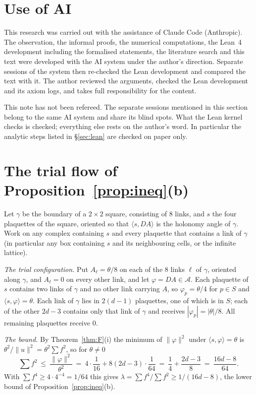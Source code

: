 \documentclass[11pt,a4paper]{article}
\theoremstyle{definition}
\theoremstyle{remark}
\newcommand{\cA}{\mathcal{A}}
\begin{document}
\section{Use of AI}\label{sec:ai}

This research was carried out with the assistance of Claude Code (Anthropic). The observation, the informal proofs, the numerical computations, the Lean~4 development including the formalised statements, the literature search and this text were developed with the AI system under the author's direction. Separate sessions of the system then re-checked the Lean development and compared the text with it. The author reviewed the arguments, checked the Lean development and its axiom logs, and takes full responsibility for the content.

This note has not been refereed. The separate sessions mentioned in this section belong to the same AI system and share its blind spots. What the Lean kernel checks is checked; everything else rests on the author's word. In particular the analytic steps listed in \S\ref{sec:lean} are checked on paper only.

\appendix
\section{The trial flow of Proposition~\ref{prop:ineq}(b)}\label{app:trial}

Let $\gamma$ be the boundary of a $2\times2$ square, consisting of $8$ links, and $s$ the four plaquettes of the square, oriented so that $\langle s,DA\rangle$ is the holonomy angle of $\gamma$. Work on any complex containing $s$ and every plaquette that contains a link of $\gamma$ (in particular any box containing $s$ and its neighbouring cells, or the infinite lattice).

\emph{The trial configuration.} Put $A_\ell=\theta/8$ on each of the $8$ links $\ell$ of $\gamma$, oriented along $\gamma$, and $A_\ell=0$ on every other link, and let $\varphi=DA\in\cA$. Each plaquette of $s$ contains two links of $\gamma$ and no other link carrying $A$, so $\varphi_p=\theta/4$ for $p\in S$ and $\langle s,\varphi\rangle=\theta$. Each link of $\gamma$ lies in $2(d-1)$ plaquettes, one of which is in $S$; each of the other $2d-3$ contains only that link of $\gamma$ and receives $|\varphi_p|=|\theta|/8$. All remaining plaquettes receive $0$.

\emph{The bound.} By Theorem~\ref{thm:F}(i) the minimum of $\|\varphi\|^2$ under $\langle s,\varphi\rangle=\theta$ is $\theta^2/\|u\|^2=\theta^2\sum f^2$, so for $\theta\neq0$
\[
\sum f^2\ \le\ \frac{\|\varphi\|^2}{\theta^2}\ =\ 4\cdot\frac1{16}+8(2d-3)\cdot\frac1{64}\ =\ \frac14+\frac{2d-3}8\ =\ \frac{16d-8}{64}.
\]
With $\sum f^4\ge4\cdot4^{-4}=1/64$ this gives $\lambda=\sum f^4/\sum f^2\ge1/(16d-8)$, the lower bound of Proposition~\ref{prop:ineq}(b).
\end{document}

